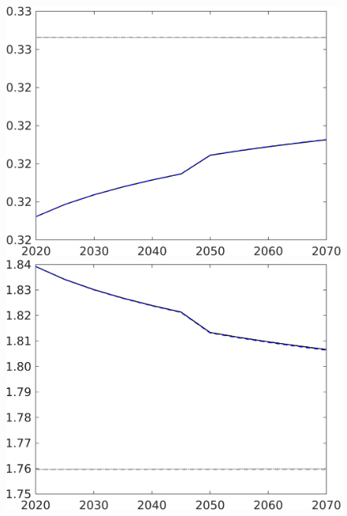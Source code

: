 \begin{figure}[h!!]
\begin{minipage}[]{0.32\textwidth}
	\end{minipage}
	\begin{minipage}[]{0.32\textwidth}
		\includegraphics[width=1\textwidth]{../../codding_model/own_basedOnFried/optimalPol_190722_tidiedUp/figures/all_10Aout22/CountXgrTaulLF_target_hl_spillover0_sep1_extern0_PV1_etaa0.79_lgd0.png}
	\end{minipage}
	\begin{minipage}[]{0.32\textwidth}
		\includegraphics[width=1\textwidth]{../../codding_model/own_basedOnFried/optimalPol_190722_tidiedUp/figures/all_10Aout22/CountXgrTaulLF_target_whwl_spillover0_sep1_extern0_PV1_etaa0.79_lgd0.png}

\end{minipage}
\end{figure}
